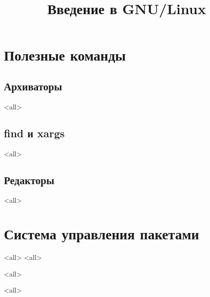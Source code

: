 

\title{Введение в GNU/Linux}








\begin{frame}
	\frametitle{}
	\titlepage
	\vspace{-0.5cm}
	\begin{center}
	\end{center}
\end{frame}


\begin{frame}
	\tableofcontents
	[hideallsubsections]
\end{frame}



\section{Полезные команды}

\subsection{Архиваторы}
\mode<all>{}

\subsection{find и xargs}
\mode<all>{}

\subsection{Редакторы}
\mode<all>{}

\section{Система управления пакетами}

\mode<all>{}
\mode<all>{}

\mode<all>{}

\mode<all>{}



